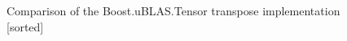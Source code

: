 \begin{figure}[htb]
    \centering
    \caption*{Comparison of the Boost.uBLAS.Tensor transpose implementation [sorted]}
    \label{fig:trans_outplace_Sspeedup_per220}
    \qquad
    \label{fig:trans_outplace_Dspeedup_per220}
\end{figure}

